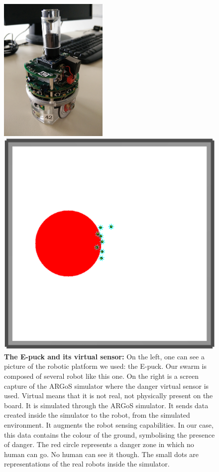 \documentclass[oneside, a4paper, 12pt]{memoir}
\let\oldCaption\caption
\renewcommand{\caption}[2]{
\oldCaption[#1]{{\small\sffamily\bfseries #1:} #2}
}
\begin{document}
		\begin{figure}[!htp]
			\begin{minipage}[c]{0.49\textwidth}
				\includegraphics[height=7cm]{images/e-puck.jpg}			
			\end{minipage}
			\begin{minipage}[c]{0.49\textwidth}
				\includegraphics[width=\textwidth]{../Experiments/No_Human/red_circle.png}			
			\end{minipage}
			
			\caption{The E-puck and its virtual sensor}{On the left, one can see a picture of the robotic platform we used: the E-puck. Our swarm is composed of several robot like this one. On the right is a screen capture of the ARGoS simulator \citep{pinciroli2012argos} where the danger virtual sensor is used. Virtual means that it is not real, not physically present on the board. It is simulated through the ARGoS simulator. It sends data created inside the simulator to the robot, from the simulated environment. It augments the robot sensing capabilities. In our case, this data contains the colour of the ground, symbolising the presence of danger. The red circle represents a danger zone in which no human can go. No human can see it though. The small dots are representations of the real robots inside the simulator.}
			\label{fig:e-puck_red_zones}
		\end{figure}
		
\end{document}
